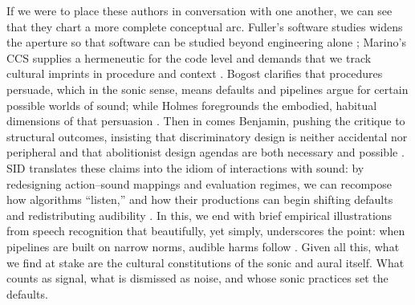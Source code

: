 If we were to place these authors in conversation with one another, we can see that they chart a more complete conceptual arc. Fuller’s software studies widens the aperture so that software can be studied beyond engineering alone \parencite{Fuller_2008}; Marino’s CCS supplies a hermeneutic for the code level and demands that we track cultural imprints in procedure and context \parencite{Marino_2020}. Bogost clarifies that procedures persuade, which in the sonic sense, means defaults and pipelines argue for certain possible worlds of sound; while Holmes foregrounds the embodied, habitual dimensions of that persuasion \parencite{Bogost_2007,Holmes_2017}. Then in comes Benjamin, pushing the critique to structural outcomes, insisting that discriminatory design is neither accidental nor peripheral and that abolitionist design agendas are both necessary and possible \parencite{Benjamin_2019a}. SID translates these claims into the idiom of interactions with sound: by redesigning action–sound mappings and evaluation regimes, we can recompose how algorithms “listen,” and how their productions can begin shifting defaults and redistributing audibility \parencite{Franinovic_Serafin_2013}. In this, we end with brief empirical illustrations from speech recognition that beautifully, yet simply, underscores the point: when pipelines are built on narrow norms, audible harms follow \parencite{Cunningham_etAl_2025}. Given all this, what we find at stake are the cultural constitutions of the sonic and aural itself. What counts as signal, what is dismissed as noise, and whose sonic practices set the defaults.